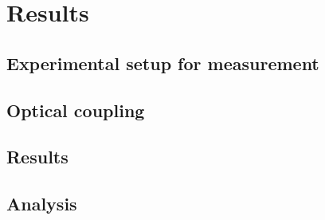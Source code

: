 \documentclass[../report.tex]{subfiles}
\begin{document}
	
\chapter{Results}

	\section{Experimental setup for measurement}
	
	\section{Optical coupling}
	
	\section{Results}
	
	\section{Analysis}
	
\end{document}
